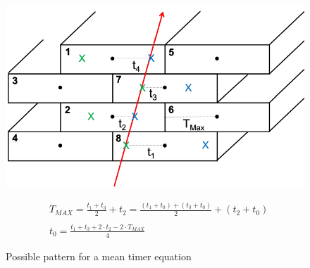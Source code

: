 \documentclass[a4paper,11pt]{book}
\begin{document}
\begin{figure}[hbtp]
\begin{minipage}[c]{0.5\textwidth}
\centering
\includegraphics[scale=0.5]{pictures/scheme_track_chamber.pdf}
\caption{Possible pattern for a mean timer equation}
\label{fig:alignment_pattern}
\end{minipage}  
\begin{minipage}[c]{0.5\textwidth}
\begin{align}
&T_{MAX} = \frac{t_1+t_3}{2} + t_2 = \frac{(t_1 + t_0) + (t_3 + t_0)}{2} + (t_2 + t_0) \nonumber \\
& \nonumber\\
&t_0 = \frac{t_1 + t_3 + 2\cdot t_2 - 2\cdot T_{MAX}}{4} \label{eq:t0_pattern}
\end{align}
\end{minipage}
\end{figure}
\end{document}
